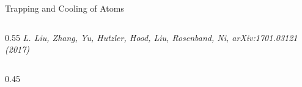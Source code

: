 \documentclass[final]{beamer}
\newlength{\coltwowid}
\begin{document}
\begin{frame}[t]
\begin{columns}[t]
\begin{column}{\coltwowid}
\begin{block}{Trapping and Cooling of Atoms}
\begin{columns}[T]
\begin{column}{0.55\coltwowid}
            \textit{\small L. Liu, Zhang, Yu, Hutzler, Hood, Liu, Rosenband, Ni,
              arXiv:1701.03121 (2017)}
          \end{column}
        \end{columns}
        \begin{columns}[T]
          \begin{column}{0.45\coltwowid}
            \vspace{1ex}
            \begin{center}
\end{center}
\end{column}
\end{columns}
\end{block}
\end{column}
\end{columns}
\end{frame}
\end{document}
